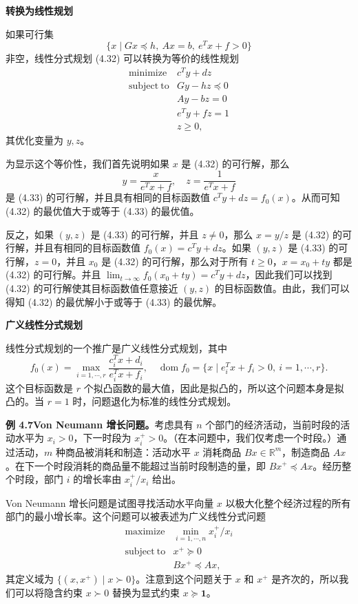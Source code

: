 \documentclass[UTF8,12pt,a4paper,fontset=fandol]{ctexart}
\begin{document}
\noindent\textbf{转换为线性规划}

如果可行集
\[
\{x\mid Gx\preceq h,\ Ax=b,\ e^Tx+f>0\}
\]
非空，线性分式规划 (4.32) 可以转换为等价的线性规划
\begin{equation}
\begin{array}{ll}
\mathop{\mathrm{minimize}} & c^Ty+dz\\
\mathrm{subject\ to} & Gy-hz\preceq 0\\
& Ay-bz=0\\
& e^Ty+fz=1\\
& z\geq 0,
\end{array}
\tag{4.33}
\end{equation}
其优化变量为 $y,z$。

为显示这个等价性，我们首先说明如果 $x$ 是 (4.32) 的可行解，那么
\[
y=\frac{x}{e^Tx+f},\quad z=\frac{1}{e^Tx+f}
\]
是 (4.33) 的可行解，并且具有相同的目标函数值 $c^Ty+dz=f_0(x)$。从而可知 (4.32) 的最优值大于或等于 (4.33) 的最优值。

反之，如果 $(y,z)$ 是 (4.33) 的可行解，并且 $z\neq 0$，那么 $x=y/z$ 是 (4.32) 的可行解，并且有相同的目标函数值 $f_0(x)=c^Ty+dz$。如果 $(y,z)$ 是 (4.33) 的可行解，$z=0$，并且 $x_0$ 是 (4.32) 的可行解，那么对于所有 $t\geq 0$，$x=x_0+ty$ 都是 (4.32) 的可行解。并且 $\lim_{t\to\infty}f_0(x_0+ty)=c^Ty+dz$，因此我们可以找到 (4.32) 的可行解使其目标函数值任意接近 $(y,z)$ 的目标函数值。由此，我们可以得知 (4.32) 的最优解小于或等于 (4.33) 的最优解。

\noindent\textbf{广义线性分式规划}

线性分式规划的一个推广是广义线性分式规划，其中
\[
f_0(x)=\max_{i=1,\cdots,r}\frac{c_i^Tx+d_i}{e_i^Tx+f_i},\quad
\operatorname{dom} f_0=\{x\mid e_i^Tx+f_i>0,\ i=1,\cdots,r\}.
\]
这个目标函数是 $r$ 个拟凸函数的最大值，因此是拟凸的，所以这个问题本身是拟凸的。当 $r=1$ 时，问题退化为标准的线性分式规划。

\noindent\textbf{例 4.7\quad Von Neumann 增长问题。}\quad 考虑具有 $n$ 个部门的经济活动，当前时段的活动水平为 $x_i>0$，下一时段为 $x_i^+>0$。（在本问题中，我们仅考虑一个时段。）通过活动，$m$ 种商品被消耗和制造：活动水平 $x$ 消耗商品 $Bx\in\mathbb{R}^m$，制造商品 $Ax$。在下一个时段消耗的商品量不能超过当前时段制造的量，即 $Bx^+\preceq Ax$。经历整个时段，部门 $i$ 的增长率由 $x_i^+/x_i$ 给出。

Von Neumann 增长问题是试图寻找活动水平向量 $x$ 以极大化整个经济过程的所有部门的最小增长率。这个问题可以被表述为广义线性分式问题
\[
\begin{array}{ll}
\mathop{\mathrm{maximize}} & \min_{i=1,\cdots,n} x_i^+/x_i\\
\mathrm{subject\ to} & x^+\succeq 0\\
& Bx^+\preceq Ax,
\end{array}
\]
其定义域为 $\{(x,x^+)\mid x\succ 0\}$。注意到这个问题关于 $x$ 和 $x^+$ 是齐次的，所以我们可以将隐含约束 $x\succ 0$ 替换为显式约束 $x\succeq \mathbf{1}$。
\end{document}

